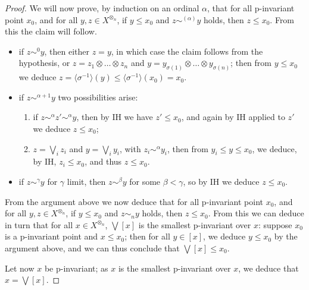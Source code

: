 \begin{proof}
We will now prove, by induction on an ordinal $\alpha$, that for all p-invariant point $x_{0}$, and for all $y,z\in X^{\otimes_{n}}$, if 
$y\leq x_{0}$ and $z\sim^{(\alpha)} y$ holds, then $z\leq x_{0}$.
From this the claim will follow.

\begin{itemize}
\item if $z\sim^{0} y$, then either $z=y$, in which case the claim follows from the hypothesis, or $z=z_{1}\otimes \dots \otimes z_{n}$ and $y=y_{\sigma(1)}\otimes \dots \otimes y_{\sigma(n)}$; then from $y\leq x_{0}$ we deduce $z=\langle \sigma^{-1} \rangle(y)\leq \langle \sigma^{-1}\rangle(x_{0})=x_{0}$.

\item if $z\sim^{\alpha+1}y$ two possibilities arise:
	\begin{enumerate}
	\item if $z\sim^{\alpha}z'\sim^{\alpha}y$, then by IH we have $z'\leq x_{0}$, and again by IH applied to $z'$ we deduce $z\leq x_{0}$;
	\item $z=\bigvee_{i}z_{i}$ and $y=\bigvee_{i}y_{i}$, with $z_{i}\sim^{\alpha}y_{i}$, then from $y_{i}\leq y\leq x_{0}$, we deduce, by IH, $z_{i}\leq x_{0}$, and thus $z\leq x_{0}$.
	
	\end{enumerate}

\item if $z\sim^{\gamma}y$ for $\gamma$ limit, then $z\sim^{\beta}y$ for some $\beta<\gamma$, so by IH we deduce $z\leq x_{0}$.


\end{itemize}
From the argument above we now deduce that for all p-invariant point $x_{0}$, and for all $y,z\in X^{\otimes_{n}}$, if 
$y\leq x_{0}$ and 
$z\sim_{n}y$ holds, then $z\leq x_{0}$.
From this we can deduce in turn that for all $x\in X^{\otimes_{n}}$, $\bigvee[x]$ is the smallest p-invariant over $x$: suppose $x_{0}$ is a p-invariant point and $x\leq x_{0}$; then for all $y\in [x]$, we deduce $y\leq x_{0}$ by the argument above, and we can thus conclude that $\bigvee[x]\leq x_{0}$.

Let now $x$ be p-invariant; as $x$ is the smallest p-invariant over $x$, we deduce that $x= \bigvee[x]$.



\end{proof}
